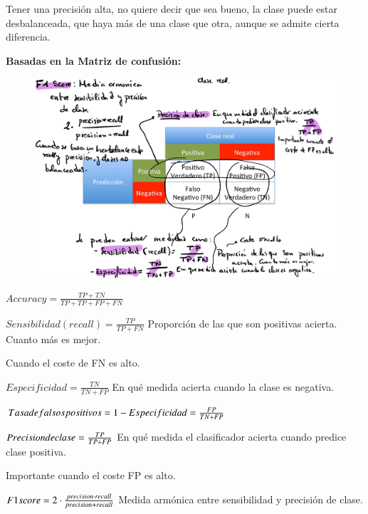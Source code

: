 \documentclass[12pt]{report} %
\begin{document}
Tener una precisión alta, no quiere decir que sea bueno, la clase puede
estar desbalanceada, que haya más de una clase que otra, aunque se
admite cierta diferencia.

\textbf{Basadas en la Matriz de confusión:}

\begin{figure}[H]
	{\includegraphics[scale=.2]{Untitled 11.png}}
\end{figure}

\(Accuracy= \frac {TP+TN}{TP+TP+FP+FN}\)

\(Sensibilidad(recall)= \frac {TP}{TP+FN}\) Proporción de las que son
positivas acierta. Cuanto más es mejor.

Cuando el coste de FN es alto.

\(Especificidad= \frac {TN}{TN+FP}\) En qué medida acierta cuando la
clase es negativa.

\(Tasa \space de\space falsos \space positivos=1-Especificidad= \frac {FP}{TN+FP}\)

\(Precision \space de \space clase= \frac {TP}{TP+FP}\) En qué medida el
clasificador acierta cuando predice clase positiva.

Importante cuando el coste FP es alto.

\(F1 \space score= 2\cdot \frac {precision \cdot recall}{precision +recall}\)
Medida armónica entre sensibilidad y precisión de clase.
\end{document}
